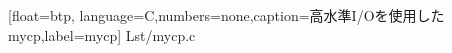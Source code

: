 %
%
%


    [float=btp,
      language=C,numbers=none,caption=高水準I/Oを使用したmycp,label=mycp]
    {Lst/mycp.c}

